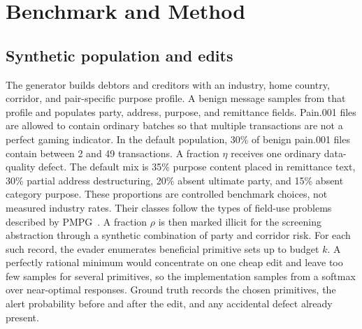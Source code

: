 \documentclass[conference]{IEEEtran}
\begin{document}
\section{Benchmark and Method}
\subsection{Synthetic population and edits}
The generator builds debtors and creditors with an industry, home country,
corridor, and pair-specific purpose profile. A benign message samples from
that profile and populates party, address, purpose, and remittance fields.
Pain.001 files are allowed to contain ordinary batches so that multiple
transactions are not a perfect gaming indicator. In the default population,
30\% of benign pain.001 files contain between 2 and 49 transactions.
A fraction $\eta$ receives one ordinary data-quality defect. The default mix
is 35\% purpose content placed in remittance text, 30\% partial address
destructuring, 20\% absent ultimate party, and 15\% absent category purpose.
These proportions are controlled benchmark choices, not measured industry
rates. Their classes follow the types of field-use problems described by
PMPG~\cite{pmpg2024}.
A fraction $\rho$ is then marked illicit for the screening abstraction through
a synthetic combination of party and corridor risk. For each such record, the
evader enumerates beneficial primitive sets up to budget $k$. A perfectly
rational minimum would concentrate on one cheap edit and leave too few samples
for several primitives, so the implementation samples from a softmax over
near-optimal responses. Ground truth records the chosen primitives, the alert
probability before and after the edit, and any accidental defect already
present.
\end{document}

